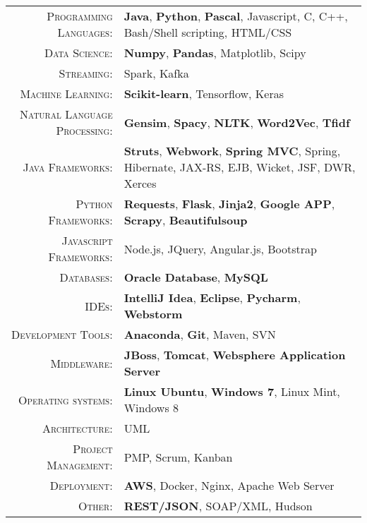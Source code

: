 %
%
%

\renewcommand{\arraystretch}{1.1}

	\begin{tabular}{>{}r>{}p{13cm}} 
		\textsc{Programming Languages:}  		&   \textbf{Java}, \textbf{Python}, \textbf{Pascal},  Javascript, C, C++, Bash/Shell scripting, HTML/CSS\\ 
		\textsc{Data Science:}                  &   \textbf{Numpy}, \textbf{Pandas}, Matplotlib, Scipy\\
		\textsc{Streaming:}                  	&   Spark, Kafka\\
		\textsc{Machine Learning:}				 &  \textbf{Scikit-learn}, Tensorflow, Keras\\
		\textsc{Natural Language Processing:} 	 & \textbf{Gensim}, \textbf{Spacy}, \textbf{NLTK}, \textbf{Word2Vec}, \textbf{Tfidf}\\
		\textsc{Java Frameworks:} 				& \textbf{Struts}, \textbf{Webwork}, \textbf{Spring MVC}, Spring, Hibernate, JAX-RS, EJB, Wicket, JSF, DWR, Xerces\\
		\textsc{Python Frameworks:} 				& \textbf{Requests}, \textbf{Flask}, \textbf{Jinja2}, \textbf{Google APP},  \textbf{Scrapy}, \textbf{Beautifulsoup}\\ 
		\textsc{Javascript Frameworks:} 				& Node.js, JQuery, Angular.js, Bootstrap \\
		\textsc{Databases:}                  &   \textbf{Oracle Database}, \textbf{MySQL} \\ 
		\textsc{IDEs:}	  		&   \textbf{IntelliJ Idea}, \textbf{Eclipse}, \textbf{Pycharm}, \textbf{Webstorm}  \\ 
		\textsc{Development Tools:} & 	  		\textbf{Anaconda}, \textbf{Git}, Maven, SVN \\
		\textsc{Middleware:}				        &   \textbf{JBoss}, \textbf{Tomcat}, \textbf{Websphere Application Server} \\ 
		\textsc{Operating systems:}	        &   \textbf{Linux Ubuntu}, \textbf{Windows 7}, Linux Mint, Windows 8\\ 
		\textsc{Architecture:}				        &   UML \\
		\textsc{Project Management:}				        &   PMP, Scrum, Kanban \\
		\textsc{Deployment:}				        &   \textbf{AWS}, Docker, Nginx, Apache Web Server\\
		\textsc{Other:}					        &   \textbf{REST/JSON}, SOAP/XML, Hudson \\
	\end{tabular}